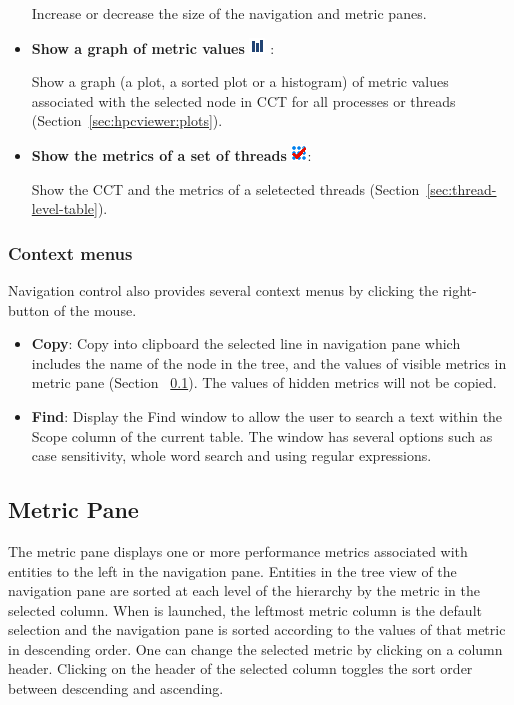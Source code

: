 \begin{itemize}
Increase or decrease the size of the navigation and metric panes.

\item \textbf{Show a graph of metric values} \includegraphics[scale=.8]{fig/hpcviewer-button-graph.png} :

Show a graph (a plot, a sorted plot or a histogram) of metric values associated with the selected node in CCT for all processes or threads (Section~\ref{sec:hpcviewer:plots}).

\item \textbf{Show the metrics of a set of threads} \includegraphics[scale=.8]{fig/hpcviewer-thread.png}:

Show the CCT and the metrics of a seletected threads  (Section~\ref{sec:thread-level-table}).

\end{itemize}


\subsubsection{Context menus}
Navigation control also provides several context menus by clicking the right-button of the mouse.
\begin{itemize}
 \item \textbf{Copy}: Copy into clipboard the selected line in navigation pane which includes the name of the node in the tree, and the values of visible metrics in metric pane (Section ~\ref{sec:pane-metric}). The values of hidden metrics will not be copied.
 \item \textbf{Find}: Display the Find window to allow the user to search a text within the Scope column of the current table. The window has several options such as case sensitivity, whole word search and using regular expressions.
\end{itemize}



\subsection{Metric Pane}
\label{sec:pane-metric}

The metric pane displays one or more performance metrics associated with entities to the left in the navigation pane.
Entities in the tree view of the navigation pane are sorted at each level of the hierarchy by the metric in the selected column.
When \hpcviewer{} is launched, the leftmost metric column is the default selection and the navigation pane is sorted according to the values of that metric in descending order.
One can change the selected metric by clicking on a column header.
Clicking on the header of the selected column toggles the sort order between descending and ascending.

